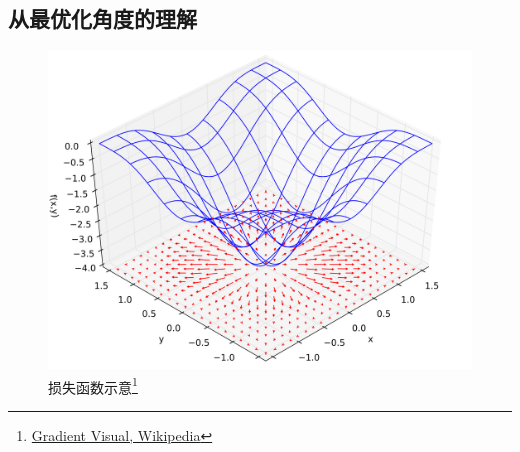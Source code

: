 \subsection{从最优化角度的理解}
\begin{frame}
    \begin{figure}[!tb]
        \includegraphics[width=\onepicwidth]{figure/gbdt/Gradient_Visual}
        \caption{损失函数示意\footnote{
                 \href{https://en.wikipedia.org/wiki/File:Gradient_Visual.svg}{Gradient Visual, Wikipedia}}}
    \end{figure}
\end{frame}

\begin{frame}
    \begin{figure}
        \centering
        \subfigure[][]{
            \resizebox{0.53\linewidth}{!}{}
        }
        \hfil
        \subfigure[][]{
            \resizebox{0.40\linewidth}{!}{}
        }
    \end{figure}
\end{frame}

\begin{frame}
    \begin{figure}
        \centering
        \resizebox{1.1\onepicwidth}{!}{}
    \end{figure}
\end{frame}

\begin{frame}
    \begin{figure}
        \centering
        \resizebox{\textwidth}{!}{}
    \end{figure}
\end{frame}


